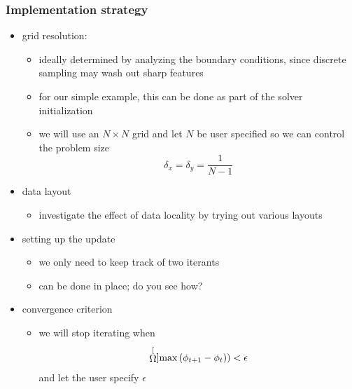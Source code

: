 \begin{frame}[fragile]
%
  \frametitle{Implementation strategy}
%
  \begin{itemize}
%
  \item grid resolution:
    \begin{itemize}
     \item ideally determined by analyzing the boundary conditions, since discrete sampling may
       wash out sharp features
     \item for our simple example, this can be done as part of the solver initialization
     \item we will use an $N \times N$ grid and let $N$ be user specified so we can control the
       problem size
       \begin{equation}
         \delta_{x} = \delta_{y} = \frac{1}{N-1}
       \end{equation}
     \end{itemize}
%
  \item data layout
    \begin{itemize}
    \item investigate the effect of data locality by trying out various layouts
    \end{itemize}
%
  \item setting up the update
    \begin{itemize}
      \item we only need to keep track of two iterants
      \item can be done in place; do you see how?
    \end{itemize}
%
  \item convergence criterion
    \begin{itemize}
    \item we will stop iterating when
      \begin{equation}
        \stackrel[\Omega]{}{\mbox{\rm max}}\, (\phi_{t+1} - \phi_{t})) < \epsilon
      \end{equation}
      and let the user specify $\epsilon$
    \end{itemize}
%
  \end{itemize}
% 
\end{frame}

%

